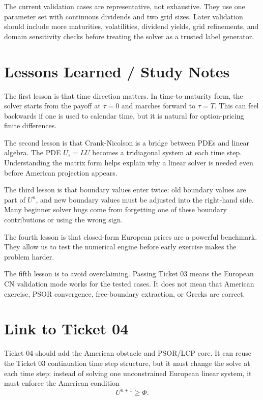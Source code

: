 \documentclass[11pt,a4paper]{article}
\begin{document}
The current validation cases are representative, not exhaustive. They use one parameter set with
continuous dividends and two grid sizes. Later validation should include more maturities,
volatilities, dividend yields, grid refinements, and domain sensitivity checks before treating the
solver as a trusted label generator.

\section{Lessons Learned / Study Notes}

The first lesson is that time direction matters. In time-to-maturity form, the solver starts from
the payoff at \(\tau=0\) and marches forward to \(\tau=T\). This can feel backwards if one is used
to calendar time, but it is natural for option-pricing finite differences.

The second lesson is that Crank-Nicolson is a bridge between PDEs and linear algebra. The PDE
\(U_{\tau}=LU\) becomes a tridiagonal system at each time step. Understanding the matrix form
helps explain why a linear solver is needed even before American projection appears.

The third lesson is that boundary values enter twice: old boundary values are part of \(U^n\), and
new boundary values must be adjusted into the right-hand side. Many beginner solver bugs come from
forgetting one of these boundary contributions or using the wrong sign.

The fourth lesson is that closed-form European prices are a powerful benchmark. They allow us to
test the numerical engine before early exercise makes the problem harder.

The fifth lesson is to avoid overclaiming. Passing Ticket 03 means the European CN validation mode
works for the tested cases. It does not mean that American exercise, PSOR convergence,
free-boundary extraction, or Greeks are correct.

\section{Link to Ticket 04}

Ticket 04 should add the American obstacle and PSOR/LCP core. It can reuse the Ticket 03
continuation time step structure, but it must change the solve at each time step: instead of
solving one unconstrained European linear system, it must enforce the American condition
\begin{equation}
  U^{n+1} \geq \Phi.
\end{equation}
\end{document}
